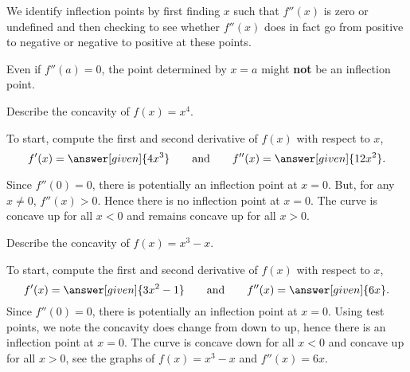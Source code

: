 \documentclass{ximera}
\begin{document}
We identify inflection points by first finding $x$ such that $f''(x)$
is zero or undefined and then checking to see whether $f''(x)$ does in
fact go from positive to negative or negative to positive at these
points.

\begin{warning}
Even if $f''(a) = 0$, the point determined by $x=a$ might \textbf{not}
be an inflection point.
\end{warning}
\begin{example}
Describe the concavity of $f(x)=x^4$. 

\begin{explanation}
To start, compute the first and second derivative of $f(x)$ with
respect to $x$,
\[
f'(x)=\answer[given]{4x^3}\qquad\text{and}\qquad f''(x)=\answer[given]{12x^2}.
\]

Since $f''(0)=0$, there is potentially an inflection point at
$x=0$. But, for any  $x\ne 0$, $f''(x)>0$. Hence there is no inflection point at $x=0$. The curve is
concave up for all $x<0$ and  remains concave up for all $x>0$.
\end{explanation}
\end{example}
\begin{example}
Describe the concavity of $f(x)=x^3-x$. 

\begin{explanation}
To start, compute the first and second derivative of $f(x)$ with
respect to $x$,
\[
f'(x)=\answer[given]{3x^2-1}\qquad\text{and}\qquad f''(x)=\answer[given]{6x}.
\]
Since $f''(0)=0$, there is potentially an inflection point at
$x=0$. Using test points, we note the concavity does change from down
to up, hence there is an inflection point at $x=0$. The curve is
concave down for all $x<0$ and concave up for all $x>0$, see the
graphs of $f(x) = x^3-x$ and $f''(x) = 6x$.
\begin{image}
\end{image}
\end{explanation}
\end{example}
\end{document}
